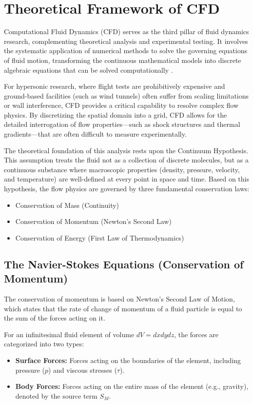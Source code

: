 \section{Theoretical Framework of CFD}
Computational Fluid Dynamics (CFD) serves as the third pillar of fluid dynamics research, complementing theoretical analysis and experimental testing. It involves the systematic application of numerical methods to solve the governing equations of fluid motion, transforming the continuous mathematical models into discrete algebraic equations that can be solved computationally \cite{versteeg2007cfd}.
\par
For hypersonic research, where flight tests are prohibitively expensive and ground-based facilities (such as wind tunnels) often suffer from scaling limitations or wall interference, CFD provides a critical capability to resolve complex flow physics. By discretizing the spatial domain into a grid, CFD allows for the detailed interrogation of flow properties—such as shock structures and thermal gradients—that are often difficult to measure experimentally.
\par
The theoretical foundation of this analysis rests upon the Continuum Hypothesis. This assumption treats the fluid not as a collection of discrete molecules, but as a continuous substance where macroscopic properties (density, pressure, velocity, and temperature) are well-defined at every point in space and time. Based on this hypothesis, the flow physics are governed by three fundamental conservation laws:
\begin{itemize}
    \item Conservation of Mass (Continuity)
    \item Conservation of Momentum (Newton's Second Law)
    \item Conservation of Energy (First Law of Thermodynamics)
\end{itemize}

\subsection{The Navier-Stokes Equations (Conservation of Momentum)}

The conservation of momentum is based on Newton's Second Law of Motion, which states that the rate of change of momentum of a fluid particle is equal to the sum of the forces acting on it.
\par
For an infinitesimal fluid element of volume $dV = dx dy dz$, the forces are categorized into two types:
\begin{itemize}
    \item \textbf{Surface Forces:} Forces acting on the boundaries of the element, including pressure ($p$) and viscous stresses ($\tau$).
    \item \textbf{Body Forces:} Forces acting on the entire mass of the element (e.g., gravity), denoted by the source term $S_M$.
\end{itemize}


